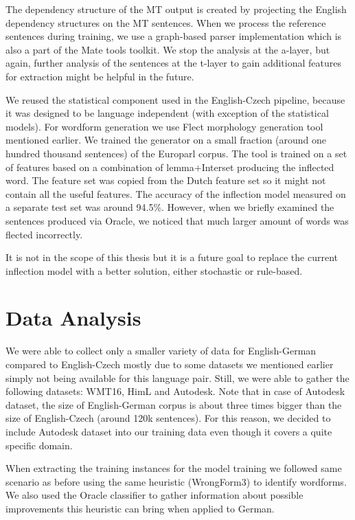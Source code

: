 The dependency structure of the MT output is created by projecting the English dependency
structures on the MT sentences. When we process the reference sentences during training, we 
use a graph-based parser implementation \citep{Bohnet:2010:VHA:1873781.1873792} which is also a part of the
Mate tools toolkit. We stop the analysis at the a-layer, but again, further analysis
of the sentences at the t-layer to gain additional features for extraction might be helpful in the future.

We reused the statistical component used in the English-Czech pipeline, because it was designed to be
language independent (with exception of the statistical models). For wordform generation we use
Flect morphology generation tool mentioned earlier. We trained the generator on a small
fraction (around one hundred thousand sentences) of the Europarl corpus. The tool is trained on a set
of features based on a combination of lemma$+$Interset producing the inflected word. The feature set
was copied from the Dutch feature set so it might not contain all the useful features. The accuracy
of the inflection model measured on a separate test set was around 94.5\%. However, when we briefly examined
the sentences produced via Oracle, we noticed that much larger amount of words was flected incorrectly.

It is not in the scope of this thesis but it is a future goal to replace the current inflection model
with a better solution, either stochastic or rule-based.

\section{Data Analysis}

We were able to collect only a smaller variety of data for English-German compared to English-Czech
 mostly due to some datasets we mentioned earlier simply not being available for this language pair. Still, we were 
able to gather the following datasets: WMT16, HimL and Autodesk. Note that in case of Autodesk dataset,
the size of English-German corpus is about three times bigger than the size of English-Czech (around 120k sentences).
For this reason, we decided to include Autodesk dataset into our training data even though it covers
a quite specific domain.

When extracting the training instances for the model training we followed same scenario
as before using the same heuristic (WrongForm3) to identify  wordforms. We also used the Oracle
classifier to gather information about possible improvements this heuristic can bring when applied to German.

